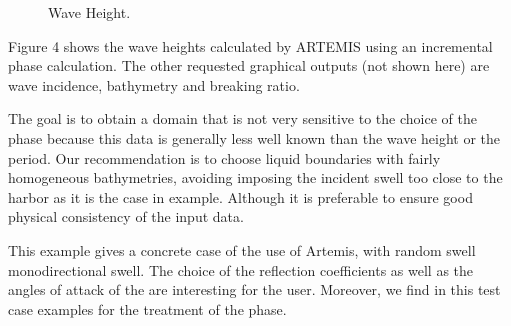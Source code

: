\begin{figure}[h]
\begin{center}
\end{center}
\caption{Wave Height.}
\label{fig:creocean_results}
\end{figure}

Figure 4 shows the wave heights calculated by ARTEMIS using
an incremental phase calculation.
The other requested graphical outputs (not shown here) are wave incidence, bathymetry and breaking ratio.

The goal is to obtain a domain that is not very sensitive to the choice of the phase because this data is
generally less well known than the wave height or the period.
Our recommendation is to choose liquid boundaries with fairly homogeneous bathymetries, avoiding imposing the incident
swell too close to the harbor as it is the case in
example. Although it is preferable to ensure good physical consistency of the input data.

This example gives a concrete case of the use of Artemis, with random swell
monodirectional swell. The choice of the reflection coefficients as well as the angles of attack of the
are interesting for the user.
Moreover, we find in this test case examples for the treatment of the
phase.

